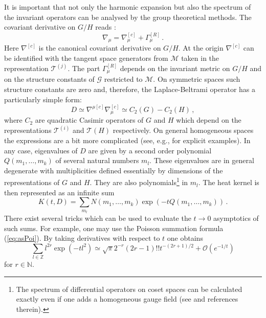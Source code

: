 It is important that not only the harmonic expansion but also
the spectrum of the invariant operators can be analysed by the group
theoretical methods. The covariant derivative on $G/H$
reads \cite{Kobayashi:1969}:
\begin{equation}
\nabla_\mu = \nabla_\mu^{[c]}+\Gamma^{[R]}_\mu \,.\label{hscovdiv}
\end{equation}
Here $\nabla^{[c]}$ is the canonical covariant derivative on
$G/H$. At the origin $\nabla^{[c]}$ can be identified with 
the tangent space generators from $\mathcal{M}$ taken in
the representation $\mathcal{T}^{(j)}$. The part $\Gamma^{[R]}_\mu$
depends on the invariant metric on $G/H$ and on the
structure constants of $\mathcal{G}$ restricted to $\mathcal{M}$.
On symmetric spaces such structure constants are zero and,
therefore, the Laplace-Beltrami operator has a particularly
simple form:
\begin{equation}
D\simeq \nabla^{\mu[c]}\nabla_\mu^{[c]} \simeq C_2 (G)-C_2 (H)\,,
\label{LapCas}
\end{equation}
where $C_2$ are quadratic Casimir operators of $G$ and $H$ which
depend on the representations $\mathcal{T}^{(i)}$ and 
$\mathcal{T}(H)$ respectively.
On general homogeneous spaces the expressions are a bit more
complicated (see, e.g., 
\cite{Vassilevich:1988em,Lyakhovsky:1991vv} for explicit
examples). In any case, eigenvalues of $D$ are given by
a second order polynomial $Q(m_1,\dots,m_k)$ of several
natural numbers $m_l$. These eigenvalues are in general
degenerate with multiplicities defined essentially 
by dimensions of the representations of $G$ and $H$.
They are also polynomials\footnote{The spectrum of differential 
operators on coset spaces can be calculated exactly even if one adds
a homogeneous gauge field (see \cite{Dolan:2003bj} and references 
therein).}
 in $m_l$. The heat kernel is then
represented as an infinite sum
\begin{equation}
K(t,D)=\sum_{m_l} N(m_1,\dots,m_k) \exp (-t Q(m_1,\dots,m_k))\,.
\label{hsheatk}
\end{equation}
There exist several tricks which can be used to evaluate
the $t\to 0$ asymptotics of such sums. For example, one may use
the Poisson summation formula (\ref{eq:asPoi}). By taking derivatives
with respect to $t$ one obtains 
\begin{equation}
\sum_{l\in \mathbb{Z}} l^{2r} \exp \left( -tl^2\right)
\simeq \sqrt{\pi} 2^{-r} (2r-1)!! t^{-(2r+1)/2} +
\mathcal{O}\left( e^{-1/t} \right)\label{diffPoi}
\end{equation}
for $r\in\mathbb{N}$.

